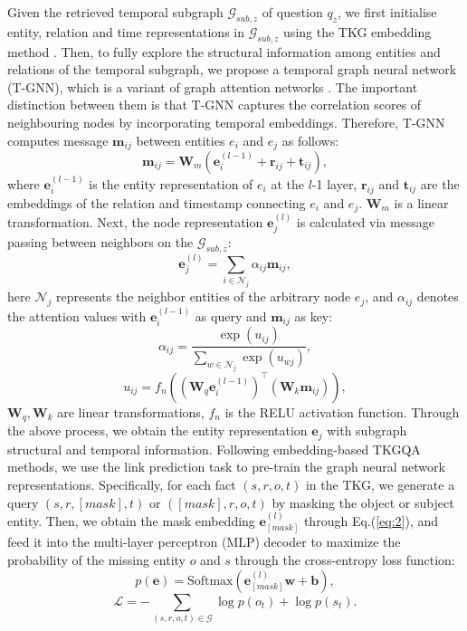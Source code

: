 \documentclass[11pt]{article}
\begin{document}
Given the retrieved temporal subgraph $\mathcal{G}_{sub,z}$ of question $q_z$, we first initialise entity, relation and time representations in $\mathcal{G}_{sub,z}$ using the TKG embedding method \cite{TNTComplEx}.
Then, to fully explore the structural information among entities and relations of the temporal subgraph, we propose a temporal graph neural network (T-GNN), which is a variant of graph attention networks \cite{gat}.
The important distinction between them is that T-GNN captures the correlation scores of neighbouring nodes by incorporating temporal embeddings.
Therefore, T-GNN computes message $\mathbf{m}_{ij}$ between entities $e_i$ and $e_j$ as follows:
\begin{equation}
\mathbf{m}_{ij}=\mathbf{W}_{m}(\mathbf{e}_{i}^{(l-1)}+\mathbf{r}_{ij}+\mathbf{t}_{ij}),
\end{equation}
where $\mathbf{e}_i^{(l-1)}$ is the entity representation of $e_i$ at the $l$-1 layer, $\mathbf{r}_{ij}$ and $\mathbf{t}_{ij}$ are the embeddings of the relation and timestamp connecting $e_i$ and $e_j$. $\mathbf{W}_{m}$ is a linear transformation.
Next, the node representation $\mathbf{e}_{j}^{(l)}$ is calculated via message passing between neighbors on the $\mathcal{G}_{sub,z}$:
\begin{equation}\label{eq:2}
\mathbf{e}_{j}^{(l)}=\sum_{i \in \mathcal{N}_{j}} \alpha_{i j} \mathbf{m}_{i j},
\end{equation}
here $\mathcal{N}_{j}$ represents the neighbor entities of the arbitrary node $e_{j}$, and $\alpha_{i j}$ denotes the attention values with $\mathbf{e}_{i}^{(l-1)}$ as query and $\mathbf{m}_{i j}$ as key:
\begin{equation}
\alpha_{i j}=\frac{\exp \left(u_{i j}\right)}{\sum_{w \in \mathcal{N}_{j}} \exp \left(u_{w j}\right)},
\end{equation}
\begin{equation}
u_{i j}=f_n((\mathbf{W}_{q} \mathbf{e}_{i}^{(l-1)})^{\top}\left(\mathbf{W}_{k} \mathbf{m}_{i j}\right)),
\end{equation}
$\mathbf{W}_{q}, \mathbf{W}_{k}$ are linear transformations, $f_n$ is the RELU activation function.
Through the above process, we obtain the entity representation $\mathbf{e}_j$ with subgraph structural and temporal information.
Following embedding-based TKGQA methods, we use the link prediction task to pre-train the graph neural network representations. Specifically, for each fact $(s,r,o,t)$ in the TKG, we generate a query $(s,r,[mask],t)$ or $([mask],r,o,t)$ by masking  the  object or subject entity.  Then, we obtain the mask embedding $\mathbf{e}_{[mask]}^{(l)}$ through Eq.(\ref{eq:2}),  and feed it into the multi-layer perceptron (MLP) decoder to maximize the probability of the missing entity $o$  and $s$ through the cross-entropy loss function:
\begin{equation}
    p\left(\mathbf{e} \right) = \text{Softmax} (\mathbf{e}_{[mask]}^{(l)}\mathbf{w}+\mathbf{b}),
\end{equation}
\begin{equation}
  \mathcal{L}=-\sum_{(s, r, o, t)\in\mathcal{G}} \log p({o_t})+\log p({s_t}).
\end{equation}
\end{document}
